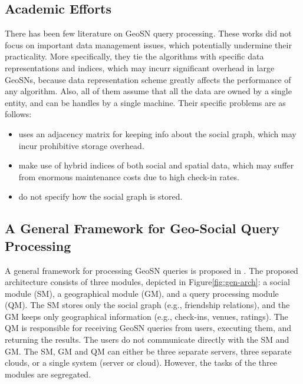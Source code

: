\subsection{Academic Efforts}
There has been few literature on GeoSN query processing\cite{amir2007buddy,yiu2010efficient,khoshgozaran2009private,scellato2010distance}. These works did not focus on important data management issues, which potentially undermine their practicality. More specifically, they tie the algorithms with specific data representations and indices, which may incurr significant overhead in large GeoSNs, because data representation scheme greatly affects the performance of any algorithm. Also, all of them assume that all the data are owned by a single entity, and can be handles by a single machine. Their specific problems are as follows:
\begin{itemize}
	\item\cite{khoshgozaran2009private} uses an adjacency matrix for keeping info about the social graph, which may incur prohibitive storage overhead. 
	\item\cite{amir2007buddy,scellato2010distance} make use of hybrid indices of both social and spatial data, which may suffer from enormous maintenance costs due to high check-in rates. 
	\item\cite{yiu2010efficient,scellato2010distance} do not specify how the social graph is stored. 
\end{itemize}

\subsection{A General Framework for Geo-Social Query Processing\cite{armenatzoglou2013general}}
A general framework for processing GeoSN queries is proposed in \cite{armenatzoglou2013general}.
The proposed architecture consists of three modules, depicted in Figure\ref{fig:gen-arch}: a social module (SM), a geographical module (GM), and a query processing module (QM). 
The SM stores only the social graph (e.g., friendship relations), and the GM keeps only geographical information (e.g., check-ins, venues, ratings). The QM is responsible for receiving GeoSN queries from users, executing them, and returning the results. The users do not communicate directly with the SM and GM. The SM, GM and QM can either be three separate servers, three separate clouds, or a single system (server or cloud). However, the tasks of the three modules are segregated.

